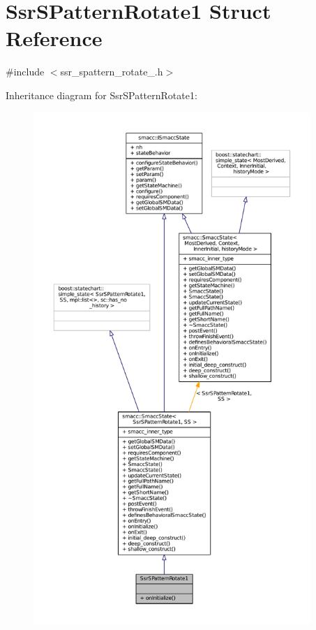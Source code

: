 \hypertarget{structSsrSPatternRotate1}{}\section{Ssr\+S\+Pattern\+Rotate1 Struct Reference}
\label{structSsrSPatternRotate1}


{\ttfamily \#include $<$ssr\+\_\+spattern\+\_\+rotate\+\_.\+h$>$}



Inheritance diagram for Ssr\+S\+Pattern\+Rotate1\+:
\nopagebreak
\begin{figure}[H]
\begin{center}
\leavevmode
\includegraphics[height=550pt]{structSsrSPatternRotate1__inherit__graph}
\end{center}
\end{figure}


